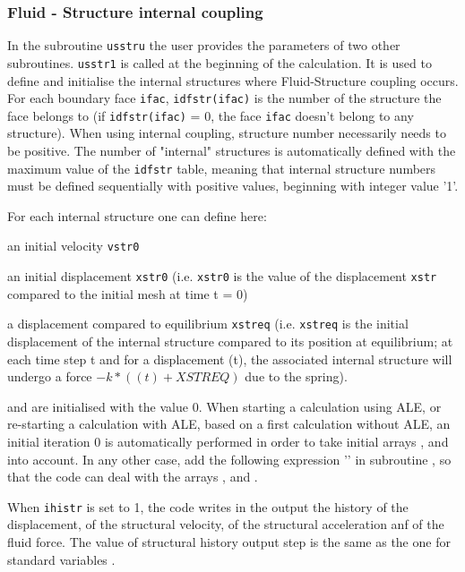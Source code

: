 {{{%
\subsubsection{Fluid - Structure internal coupling}\label{sec:ALE}

In the subroutine \texttt{usstru} the user provides the parameters of two other subroutines.
\texttt{usstr1} is called at the beginning of the calculation. It is used to define
 and initialise the internal structures where Fluid-Structure coupling occurs.
For each boundary face \texttt{ifac}, \texttt{idfstr(ifac)} is the number of the structure
 the face belongs to (if \texttt{idfstr(ifac)} = 0, the face \texttt{ifac} doesn't belong
 to any structure). When using internal coupling, structure number necessarily needs to be
 positive. The number of "internal" structures is automatically defined with the maximum
 value of the \texttt{idfstr} table, meaning that internal structure numbers must be defined
 sequentially with positive values, beginning with integer value '1'.

For each internal structure one can define here:
\begin{list}{-}{}
 \item an initial velocity \texttt{vstr0}
 \item an initial displacement \texttt{xstr0} (i.e. \texttt{xstr0} is the value of the
 displacement \texttt{xstr} compared to the initial mesh at time t = 0)
 \item a displacement compared to equilibrium  \texttt{xstreq} (i.e. \texttt{xstreq}
 is the initial displacement of the internal structure compared to its position at
 equilibrium; at each time step t and for a displacement (t), the associated
 internal structure will undergo a force $-k*(\text{}(t)+XSTREQ)$ due to the spring).
\end{list}
 and  are initialised with the value 0.
When starting a calculation using ALE, or re-starting a calculation with ALE, based
 on a first calculation without ALE, an initial iteration 0 is automatically performed
 in order to take initial arrays ,  and  into
 account. In any other case, add the following expression '' in subroutine
 , so that the code can deal with the arrays ,  and .

When \texttt{ihistr} is set to 1, the code writes in the output the history of the
 displacement, of the structural velocity, of the structural acceleration anf of the
 fluid force. The value of structural history output step is the same as the one for
 standard variables .

}}}
